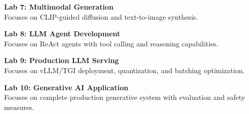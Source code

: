 \vspace{0.2cm}

\noindent\textbf{Lab 7: Multimodal Generation} \\
Focuses on CLIP-guided diffusion and text-to-image synthesis.

\vspace{0.2cm}

\noindent\textbf{Lab 8: LLM Agent Development} \\
Focuses on ReAct agents with tool calling and reasoning capabilities.

\vspace{0.2cm}

\noindent\textbf{Lab 9: Production LLM Serving} \\
Focuses on vLLM/TGI deployment, quantization, and batching optimization.

\vspace{0.2cm}

\noindent\textbf{Lab 10: Generative AI Application} \\
Focuses on complete production generative system with evaluation and safety measures.

\vspace{0.2cm}

\newpage
{}
